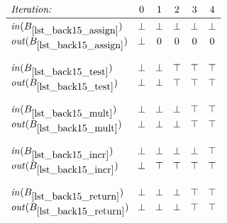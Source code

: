 \begin{minipage}{2.25in}
\begin{math}
  \begin{array}{l@{\phantom{X}}cccccc}
    \textit{Iteration:} &
    0 &
    1 &
    2 &
    3 &
    4 \\\midrule

    \inB{lst_back15_assign} & %
    \bot & %
    \bot & %
    \bot & %
    \bot & %
    \bot \\ %
    \outB{lst_back15_assign} & %
    \bot & %
    0 & %
    0 & %
    0 & %
    0 \\\\ %

    \inB{lst_back15_test} & %
    \bot & %
    \bot & %
    \top & %
    \top & %
    \top\\ %
    \outB{lst_back15_test} & %
    \bot & %
    \bot & %
    \top & %
    \top & %
    \top \\\\ %

    \inB{lst_back15_mult} & %
    \bot & %
    \bot & %
    \bot & %
    \top & %
    \top \\ %
    \outB{lst_back15_mult} & %
    \bot & %
    \bot & %
    \bot & %
    \top & %
    \top \\\\ %

    \inB{lst_back15_incr} & %
    \bot & %
    \bot & %
    \bot & %
    \bot & %
    \top \\ %
    \outB{lst_back15_incr} & %
    \bot & %
    \top & %
    \top & %
    \top & %
    \top \\\\ %

    \inB{lst_back15_return} & %
    \bot & %
    \bot & %
    \bot & %
    \top & %
    \top \\ %
    \outB{lst_back15_return} & %
    \bot & %
    \bot & %
    \bot & %
    \top & %
    \top \\\\ %
  \end{array}
\end{math}
\end{minipage}
